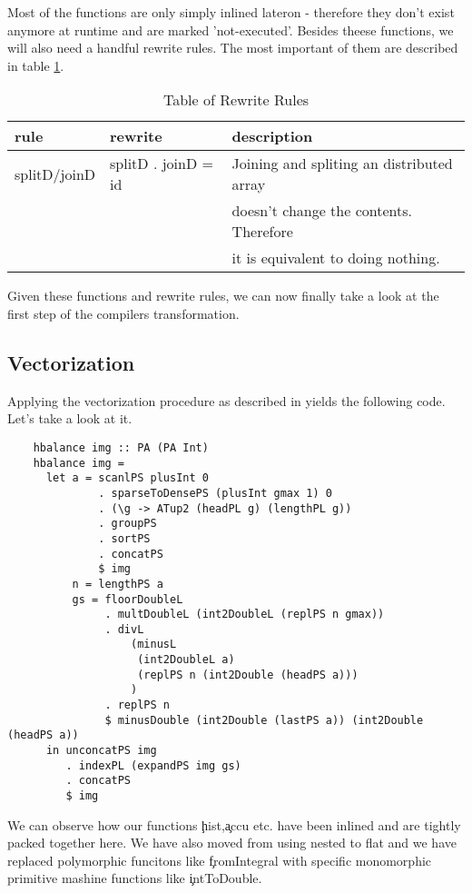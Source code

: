     Most of the functions are only simply inlined lateron - therefore they don't exist anymore at runtime and
    are marked 'not-executed'. Besides theese functions, we will also need a handful rewrite rules.
    The most important of them are described in table \ref{rules}.
    
    \begin{table}[h]
      \caption{Table of Rewrite Rules}
      \label{rules}
      \begin{tabular}{lll}
          \toprule
          rule & rewrite & description \\
          \midrule
          splitD/joinD & splitD . joinD = id & Joining and spliting an distributed array  \\
          & & doesn't change the contents. Therefore \\
          & & it is equivalent to doing nothing. \\
       \end{tabular}
    \end{table}
    
    Given these functions and rewrite rules, we can now finally take a look at the first step of the compilers transformation.
    
    \subsection{Vectorization}
      Applying the vectorization procedure as described in \cite{Harness2008} yields the following code. Let's take a look  at it.
      
      \begin{lstlisting}
    hbalance img :: PA (PA Int)
    hbalance img = 
      let a = scanlPS plusInt 0
              . sparseToDensePS (plusInt gmax 1) 0
              . (\g -> ATup2 (headPL g) (lengthPL g))
              . groupPS
              . sortPS
              . concatPS
              $ img
          n = lengthPS a
          gs = floorDoubleL
               . multDoubleL (int2DoubleL (replPS n gmax))
               . divL
                   (minusL
                    (int2DoubleL a)
                    (replPS n (int2Double (headPS a)))
                   )
               . replPS n
               $ minusDouble (int2Double (lastPS a)) (int2Double (headPS a))
      in unconcatPS img
         . indexPL (expandPS img gs)
         . concatPS
         $ img
      \end{lstlisting}
      We can observe how our functions \c{hist},\c{accu} etc. have been inlined and are tightly packed together here.
      We have also moved from using nested \pan to flat \pav and we have replaced polymorphic funcitons like \c{fromIntegral}
      with specific monomorphic primitive mashine functions like \c{intToDouble}.
      
